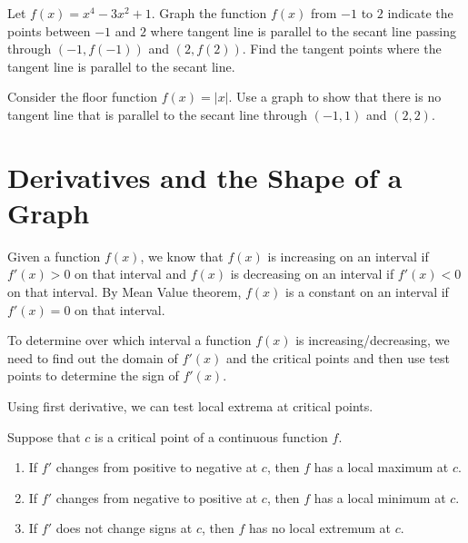 \documentclass[]{book}
\providecommand{\tightlist}{%
  \setlength{\itemsep}{0pt}\setlength{\parskip}{0pt}}
\theoremstyle{definition}
\theoremstyle{definition}
\theoremstyle{definition}
\theoremstyle{remark}
\let\BeginKnitrBlock\begin \let\EndKnitrBlock\end
\begin{document}
\BeginKnitrBlock{exercise}
\protect\hypertarget{exr:unnamed-chunk-103}{}{\label{exr:unnamed-chunk-103} }
Let \(f(x)=x^4-3x^2+1\). Graph the function \(f(x)\) from \(-1\) to \(2\) indicate the points between \(-1\) and \(2\) where tangent line is parallel to the secant line passing through \((-1, f(-1))\) and \((2, f(2))\). Find the tangent points where the tangent line is parallel to the secant line.
\EndKnitrBlock{exercise}

\BeginKnitrBlock{exercise}
\protect\hypertarget{exr:unnamed-chunk-104}{}{\label{exr:unnamed-chunk-104} }
Consider the floor function \(f(x)=|x|\). Use a graph to show that there is no tangent line that is parallel to the secant line through \((-1, 1)\) and \((2,2)\).
\EndKnitrBlock{exercise}

\hypertarget{derivatives-and-the-shape-of-a-graph}{%
\section{Derivatives and the Shape of a Graph}\label{derivatives-and-the-shape-of-a-graph}}

Given a function \(f(x)\), we know that \(f(x)\) is increasing on an interval if \(f'(x)>0\) on that interval and \(f(x)\) is decreasing on an interval if \(f'(x)<0\) on that interval. By Mean Value theorem, \(f(x)\) is a constant on an interval if \(f'(x)=0\) on that interval.

To determine over which interval a function \(f(x)\) is increasing/decreasing, we need to find out the domain of \(f'(x)\) and the critical points and then use test points to determine the sign of \(f'(x)\).

Using first derivative, we can test local extrema at critical points.

\BeginKnitrBlock{theorem}
\protect\hypertarget{thm:unnamed-chunk-105}{}{\label{thm:unnamed-chunk-105} }
Suppose that \(c\) is a critical point of a continuous function \(f\).

\begin{enumerate}
\def\labelenumi{\arabic{enumi}.}
\tightlist
\item
  If \(f'\) changes from positive to negative at \(c\), then \(f\) has a local maximum at \(c\).
\item
  If \(f'\) changes from negative to positive at \(c\), then \(f\) has a local minimum at \(c\).
\item
  If \(f'\) does not change signs at \(c\), then \(f\) has no local extremum at \(c\).
\end{enumerate}
\EndKnitrBlock{theorem}
\end{document}

